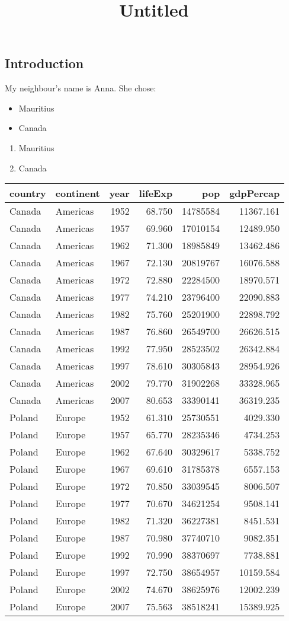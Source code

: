 \documentclass[]{article}
\title{Untitled}
\author{}
\date{}
\providecommand{\tightlist}{%
  \setlength{\itemsep}{0pt}\setlength{\parskip}{0pt}}
\begin{document}
\maketitle

{
\setcounter{tocdepth}{2}
\tableofcontents
}
\hypertarget{introduction}{%
\subsection{Introduction}\label{introduction}}

My neighbour's name is Anna. She chose:

\begin{itemize}
\tightlist
\item
  Mauritius
\item
  Canada
\end{itemize}

\begin{enumerate}
\def\labelenumi{\arabic{enumi}.}
\tightlist
\item
  Mauritius
\item
  Canada
\end{enumerate}

\begin{longtable}[]{@{}llrrrr@{}}
\toprule
country & continent & year & lifeExp & pop & gdpPercap\tabularnewline
\midrule
\endhead
Canada & Americas & 1952 & 68.750 & 14785584 & 11367.161\tabularnewline
Canada & Americas & 1957 & 69.960 & 17010154 & 12489.950\tabularnewline
Canada & Americas & 1962 & 71.300 & 18985849 & 13462.486\tabularnewline
Canada & Americas & 1967 & 72.130 & 20819767 & 16076.588\tabularnewline
Canada & Americas & 1972 & 72.880 & 22284500 & 18970.571\tabularnewline
Canada & Americas & 1977 & 74.210 & 23796400 & 22090.883\tabularnewline
Canada & Americas & 1982 & 75.760 & 25201900 & 22898.792\tabularnewline
Canada & Americas & 1987 & 76.860 & 26549700 & 26626.515\tabularnewline
Canada & Americas & 1992 & 77.950 & 28523502 & 26342.884\tabularnewline
Canada & Americas & 1997 & 78.610 & 30305843 & 28954.926\tabularnewline
Canada & Americas & 2002 & 79.770 & 31902268 & 33328.965\tabularnewline
Canada & Americas & 2007 & 80.653 & 33390141 & 36319.235\tabularnewline
Poland & Europe & 1952 & 61.310 & 25730551 & 4029.330\tabularnewline
Poland & Europe & 1957 & 65.770 & 28235346 & 4734.253\tabularnewline
Poland & Europe & 1962 & 67.640 & 30329617 & 5338.752\tabularnewline
Poland & Europe & 1967 & 69.610 & 31785378 & 6557.153\tabularnewline
Poland & Europe & 1972 & 70.850 & 33039545 & 8006.507\tabularnewline
Poland & Europe & 1977 & 70.670 & 34621254 & 9508.141\tabularnewline
Poland & Europe & 1982 & 71.320 & 36227381 & 8451.531\tabularnewline
Poland & Europe & 1987 & 70.980 & 37740710 & 9082.351\tabularnewline
Poland & Europe & 1992 & 70.990 & 38370697 & 7738.881\tabularnewline
Poland & Europe & 1997 & 72.750 & 38654957 & 10159.584\tabularnewline
Poland & Europe & 2002 & 74.670 & 38625976 & 12002.239\tabularnewline
Poland & Europe & 2007 & 75.563 & 38518241 & 15389.925\tabularnewline
\bottomrule
\end{longtable}
\end{document}
